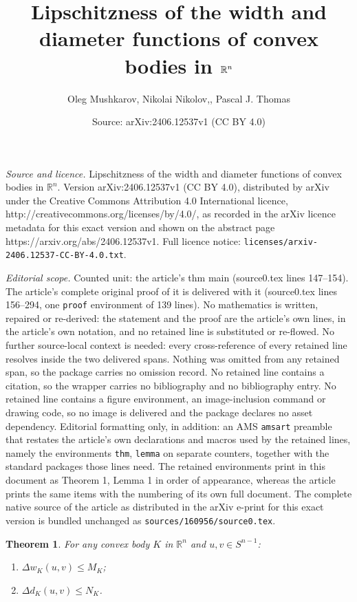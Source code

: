 \documentclass[10pt,a4paper]{amsart}
\title{Lipschitzness of the width and diameter functions of convex bodies in $\R^n$}
\author{Oleg Mushkarov, Nikolai Nikolov,, Pascal J. Thomas}
\date{Source: arXiv:2406.12537v1 (CC BY 4.0)}
\newtheorem{thm}{Theorem}
\def\R{\mathbb R}
\begin{document}
\maketitle

\noindent\emph{Source and licence.} Lipschitzness of the width and diameter functions of convex bodies in $\R^n$. Version arXiv:2406.12537v1 (CC BY 4.0), distributed by arXiv under the Creative Commons Attribution 4.0 International licence, http://creativecommons.org/licenses/by/4.0/, as recorded in the arXiv licence metadata for this exact version and shown on the abstract page https://arxiv.org/abs/2406.12537v1. Full licence notice: \texttt{licenses/arxiv-2406.12537-CC-BY-4.0.txt}.\par\smallskip

\noindent\textit{Editorial scope.} Counted unit: the article's thm main (source0.tex lines 147--154). The article's complete original proof of it is delivered with it (source0.tex lines 156--294, one \texttt{proof} environment of 139 lines). No mathematics is written, repaired or re-derived: the statement and the proof are the article's own lines, in the article's own notation, and no retained line is substituted or re-flowed.  No further source-local context is needed: every cross-reference of every retained line resolves inside the two delivered spans.  Nothing was omitted from any retained span, so the package carries no omission record.  No retained line contains a citation, so the wrapper carries no bibliography and no bibliography entry.  No retained line contains a figure environment, an image-inclusion command or drawing code, so no image is delivered and the package declares no asset dependency.  Editorial formatting only, in addition: an AMS \texttt{amsart} preamble that restates the article's own declarations and macros used by the retained lines, namely the environments \texttt{thm}, \texttt{lemma} on separate counters, together with the standard packages those lines need.  The retained environments print in this document as Theorem 1, Lemma 1 in order of appearance, whereas the article prints the same items with the numbering of its own full document.  The complete native source of the article as distributed in the arXiv e-print for this exact version is bundled unchanged as \texttt{sources/160956/source0.tex}.
\begin{thm}
\label{main} For any convex body $K$ in $\R^n$ and $u, v\in
S^{n-1}$:
\begin{enumerate}
\item $\Delta w_K(u,v)\le M_K$;
\item $\Delta d_K(u,v)\le N_K$.
\end{enumerate}
\end{thm}
\end{document}
